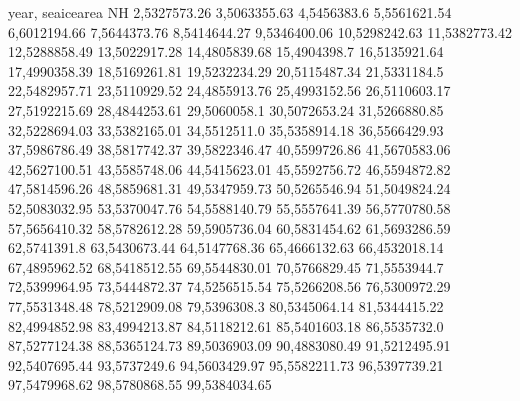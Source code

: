 year,    seaicearea NH
2,5327573.26
3,5063355.63
4,5456383.6
5,5561621.54
6,6012194.66
7,5644373.76
8,5414644.27
9,5346400.06
10,5298242.63
11,5382773.42
12,5288858.49
13,5022917.28
14,4805839.68
15,4904398.7
16,5135921.64
17,4990358.39
18,5169261.81
19,5232234.29
20,5115487.34
21,5331184.5
22,5482957.71
23,5110929.52
24,4855913.76
25,4993152.56
26,5110603.17
27,5192215.69
28,4844253.61
29,5060058.1
30,5072653.24
31,5266880.85
32,5228694.03
33,5382165.01
34,5512511.0
35,5358914.18
36,5566429.93
37,5986786.49
38,5817742.37
39,5822346.47
40,5599726.86
41,5670583.06
42,5627100.51
43,5585748.06
44,5415623.01
45,5592756.72
46,5594872.82
47,5814596.26
48,5859681.31
49,5347959.73
50,5265546.94
51,5049824.24
52,5083032.95
53,5370047.76
54,5588140.79
55,5557641.39
56,5770780.58
57,5656410.32
58,5782612.28
59,5905736.04
60,5831454.62
61,5693286.59
62,5741391.8
63,5430673.44
64,5147768.36
65,4666132.63
66,4532018.14
67,4895962.52
68,5418512.55
69,5544830.01
70,5766829.45
71,5553944.7
72,5399964.95
73,5444872.37
74,5256515.54
75,5266208.56
76,5300972.29
77,5531348.48
78,5212909.08
79,5396308.3
80,5345064.14
81,5344415.22
82,4994852.98
83,4994213.87
84,5118212.61
85,5401603.18
86,5535732.0
87,5277124.38
88,5365124.73
89,5036903.09
90,4883080.49
91,5212495.91
92,5407695.44
93,5737249.6
94,5603429.97
95,5582211.73
96,5397739.21
97,5479968.62
98,5780868.55
99,5384034.65

